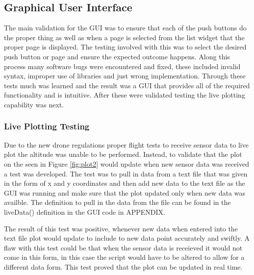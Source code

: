 \subsection{Graphical User Interface}
The main validation for the GUI was to ensure that each of the push buttons do the proper thing as well as when a page is selected from the list widget that the proper page is displayed. The testing involved with this was to select the desired push button or page and ensure the expected outcome happens. Along this process many software bugs were encountered and fixed, these included invalid syntax, improper use of libraries and just wrong implementation. Through these tests much was learned and the result was a GUI that provides all of the required functionality and is intuitive. After these were validated testing the live plotting capability was next. 
\subsubsection{Live Plotting Testing}
Due to the new drone regulations proper flight tests to receive sensor data to live plot the altitude was unable to be performed. Instead, to validate that the plot on the seen in Figure \ref{fig:plot2} would update when new sensor data was received a test was developed. The test was to pull in data from a text file that was given in the form of x and y coordinates and then add new data to the text file as the GUI was running and make sure that the plot updated only when new data was availble. The definition to pull in the data from the file can be found in the liveData() definition in the GUI code in APPENDIX.

The result of this test was positive, whenever new data when entered into the text file plot would update to include to new data point accurately and swiftly. A flaw with this test could be that when the sensor data is receieved it would not come in this form, in this case the script would have to be altered to allow for a different data form. This test proved that the plot can be updated in real time.

